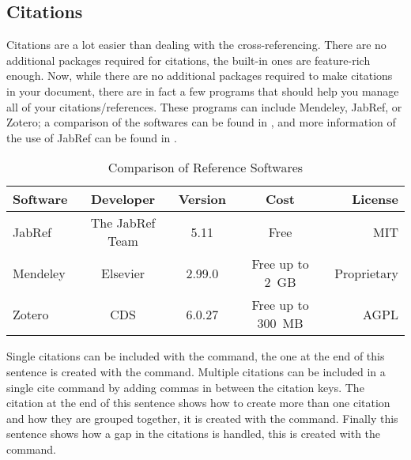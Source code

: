 		\subsection{Citations}\label{subsec:citations}
			Citations are a lot easier than dealing with the cross-referencing.
			There are no additional packages required for citations, the built-in ones are feature-rich enough.
			Now, while there are no additional packages required to make citations in your document, there are in fact a few programs that should help you manage all of your citations/references.
			These programs can include Mendeley, JabRef, or Zotero; a comparison of the softwares can be found in , and more information of the use of JabRef can be found in .
			\begin{table}[htbp]
				\centering
				\caption{Comparison of Reference Softwares}
				\label{tab:refSoftware}%
				\begin{tabularx}{0.95\linewidth}{Lcccr}
					\toprule
						Software & Developer         & Version  & Cost                    & License \\
					\midrule
						JabRef   & The JabRef Team   & 5.11     & Free                    & MIT \\
						Mendeley & Elsevier          & 2.99.0   & {Free up to 2~GB}       & Proprietary \\
						Zotero   & CDS               & 6.0.27   & {Free  up to 300~MB}    & AGPL  \\
					\bottomrule
				\end{tabularx}%
			\end{table}%
			Single citations can be included with the  command, the one at the end of this sentence is created with the  command\cite{TEST}. 
			Multiple citations can be included in a single cite command by adding commas in between the citation keys. 
			The citation at the end of this sentence shows how to create more than one citation and how they are grouped together, it is created with the  command\cite{testone,cite2,cite3,cite4,cite5}.
			Finally this sentence shows how a gap in the citations is handled, this is created with the  command\cite{testone,cite2,cite3,cite5}. 